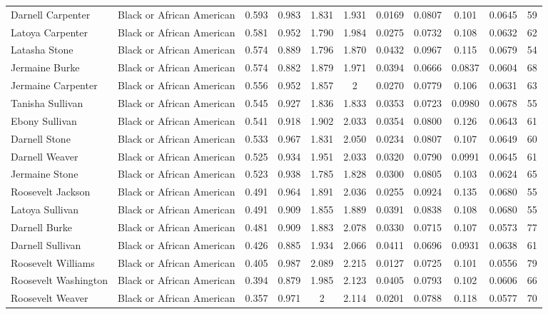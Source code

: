\documentclass[]{article}
\begin{document}
\begin{tabular}{lcccccccccc}
Darnell Carpenter & Black or African American & 0.593 & 0.983 & 1.831 & 1.931 & 0.0169 & 0.0807 & 0.101 & 0.0645 & 59 \\
Latoya Carpenter & Black or African American & 0.581 & 0.952 & 1.790 & 1.984 & 0.0275 & 0.0732 & 0.108 & 0.0632 & 62 \\
Latasha Stone & Black or African American & 0.574 & 0.889 & 1.796 & 1.870 & 0.0432 & 0.0967 & 0.115 & 0.0679 & 54 \\
Jermaine Burke & Black or African American & 0.574 & 0.882 & 1.879 & 1.971 & 0.0394 & 0.0666 & 0.0837 & 0.0604 & 68 \\
Jermaine Carpenter & Black or African American & 0.556 & 0.952 & 1.857 & 2 & 0.0270 & 0.0779 & 0.106 & 0.0631 & 63 \\
Tanisha Sullivan & Black or African American & 0.545 & 0.927 & 1.836 & 1.833 & 0.0353 & 0.0723 & 0.0980 & 0.0678 & 55 \\
Ebony Sullivan & Black or African American & 0.541 & 0.918 & 1.902 & 2.033 & 0.0354 & 0.0800 & 0.126 & 0.0643 & 61 \\
Darnell Stone & Black or African American & 0.533 & 0.967 & 1.831 & 2.050 & 0.0234 & 0.0807 & 0.107 & 0.0649 & 60 \\
Darnell Weaver & Black or African American & 0.525 & 0.934 & 1.951 & 2.033 & 0.0320 & 0.0790 & 0.0991 & 0.0645 & 61 \\
Jermaine Stone & Black or African American & 0.523 & 0.938 & 1.785 & 1.828 & 0.0300 & 0.0805 & 0.103 & 0.0624 & 65 \\
Roosevelt Jackson & Black or African American & 0.491 & 0.964 & 1.891 & 2.036 & 0.0255 & 0.0924 & 0.135 & 0.0680 & 55 \\
Latoya Sullivan & Black or African American & 0.491 & 0.909 & 1.855 & 1.889 & 0.0391 & 0.0838 & 0.108 & 0.0680 & 55 \\
Darnell Burke & Black or African American & 0.481 & 0.909 & 1.883 & 2.078 & 0.0330 & 0.0715 & 0.107 & 0.0573 & 77 \\
Darnell Sullivan & Black or African American & 0.426 & 0.885 & 1.934 & 2.066 & 0.0411 & 0.0696 & 0.0931 & 0.0638 & 61 \\
Roosevelt Williams & Black or African American & 0.405 & 0.987 & 2.089 & 2.215 & 0.0127 & 0.0725 & 0.101 & 0.0556 & 79 \\
Roosevelt Washington & Black or African American & 0.394 & 0.879 & 1.985 & 2.123 & 0.0405 & 0.0793 & 0.102 & 0.0606 & 66 \\
Roosevelt Weaver & Black or African American & 0.357 & 0.971 & 2 & 2.114 & 0.0201 & 0.0788 & 0.118 & 0.0577 & 70 \\

\end{tabular}
\end{document}
